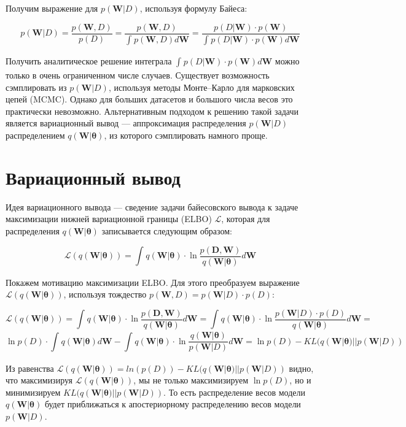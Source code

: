 \documentclass{article}
\begin{document}
Получим выражение для $p(\mathbf{W}| D)$, используя формулу Байеса:

\[
p(\mathbf{W}| D) =
\dfrac{p(\mathbf{W}, D)}{p(D)} =
\dfrac{p(\mathbf{W}, D)}{\int_{}{} p(\mathbf{W}, D) d\mathbf{W}} =
\dfrac{p(D | \mathbf{W}) \cdot p(\mathbf{W})}{\int_{}{} p(D | \mathbf{W}) \cdot p(\mathbf{W}) d\mathbf{W}}
\]

Получить аналитическое решение интеграла $\int_{}{} p(D | \mathbf{W}) \cdot p(\mathbf{W}) d\mathbf{W}$ можно только в очень ограниченном числе случаев. Существует возможность сэмплировать из $p(\mathbf{W}| D)$, используя методы Монте--Карло для марковских цепей (MCMC). Однако для больших датасетов и большого числа весов это практически невозможно. Альтернативным подходом к решению такой задачи является вариационный вывод --- аппроксимация распределения $p(\mathbf{W}| D)$ распределением $q(\mathbf{W} | \pmb{\theta})$, из которого сэмплировать намного проще.


\section{Вариационный вывод}
Идея вариационного вывода --- сведение задачи байесовского вывода к задаче максимизации нижней вариационной границы (ELBO) $\mathcal{L}$, которая для распределения $q(\mathbf{W} | \pmb{\theta})$ записывается следующим образом:

\[
\mathcal{L}(q(\mathbf{W} | \pmb{\theta})) =
\int_{}{} q(\mathbf{W} | \pmb{\theta}) \cdot \ln{\dfrac{p(\mathbf{D}, \mathbf{W})}{q(\mathbf{W} | \pmb{\theta})}} d\mathbf{W}
\]

Покажем мотивацию максимизации ELBO. Для этого преобразуем выражение $\mathcal{L}(q(\mathbf{W} | \pmb{\theta}))$, используя тождество $p(\mathbf{W}, D) = p(\mathbf{W}| D)\cdot p(D)$:

\[
\mathcal{L}(q(\mathbf{W} | \pmb{\theta})) =
\int_{}{} q(\mathbf{W} | \pmb{\theta}) \cdot \ln{\dfrac{p(\mathbf{D}, \mathbf{W})}{q(\mathbf{W} | \pmb{\theta})}} d\mathbf{W} =
\int_{}{} q(\mathbf{W} | \pmb{\theta}) \cdot \ln{\dfrac{p(\mathbf{W}| D) \cdot p(D)}{q(\mathbf{W} | \pmb{\theta})}} d\mathbf{W} =
\]\[
\ln{p(D)} \cdot \int_{}{} q(\mathbf{W} | \pmb{\theta}) d\mathbf{W} - \int_{}{} q(\mathbf{W} | \pmb{\theta})\cdot \ln{\dfrac{q(\mathbf{W} | \pmb{\theta})}{p(\mathbf{W}| D)}} d\mathbf{W} =
\ln{p(D)} - KL(q(\mathbf{W} | \pmb{\theta}) || p(\mathbf{W}| D))
\]

Из равенства $\mathcal{L}(q(\mathbf{W} | \pmb{\theta})) = ln(p(D)) - KL(q(\mathbf{W} | \pmb{\theta}) || p(\mathbf{W}| D))$ видно, что максимизируя $\mathcal{L}(q(\mathbf{W} | \pmb{\theta}))$, мы не только максимизируем $\ln {p(D)}$, но и минимизируем $KL(q(\mathbf{W} | \pmb{\theta}) || p(\mathbf{W}| D))$. То есть распределение весов модели $q(\mathbf{W} | \pmb{\theta})$ будет приближаться к апостериорному распределению весов модели $p(\mathbf{W}| D)$.
\end{document}
